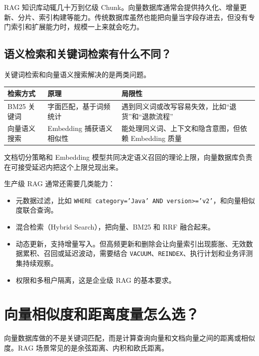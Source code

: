 \documentclass[10pt,a4paper]{ctexart}
\begin{document}
RAG 知识库动辄几十万到亿级 Chunk。向量数据库通常会提供持久化、增量更新、分片、索引构建等能力。传统数据库虽然也能把向量当字段存进去，但没有专门索引和扩展能力时，规模一上来就会吃力。



\subsection{语义检索和关键词检索有什么不同？}


关键词检索和向量语义搜索解决的是两类问题。


{\footnotesize
\begin{tabularx}{\textwidth}{|X|X|X|}
\hline
\textbf{检索方式} & \textbf{原理} & \textbf{局限性} \\
\hline
BM25 关键词 & 字面匹配，基于词频统计 & 遇到同义词或改写容易失效，比如“退货”和“退款流程” \\
\hline
向量语义搜索 & Embedding 捕获语义相似性 & 能处理同义词、上下文和隐含意图，但依赖 Embedding 质量 \\
\hline
\end{tabularx}
}



文档切分策略和 Embedding 模型共同决定语义召回的理论上限，向量数据库负责在可接受延迟内把这个上限兑现出来。



生产级 RAG 通常还需要几类能力：


\begin{itemize}[itemsep=2pt, topsep=4pt]
  \item 元数据过滤，比如 \texttt{WHERE category='Java' AND version>='v2'}，和向量相似度联合查询。
  \item 混合检索（Hybrid Search），把向量、BM25 和 RRF 融合起来。
  \item 动态更新，支持增量写入。但高频更新和删除会让向量索引出现膨胀、无效数据累积、召回或延迟波动，需要结合 \texttt{VACUUM}、\texttt{REINDEX}、执行计划和业务评测集持续观察。
  \item 权限和多租户隔离，这是企业级 RAG 的基本要求。
\end{itemize}


\section{向量相似度和距离度量怎么选？}


向量数据库做的不是关键词匹配，而是计算查询向量和文档向量之间的距离或相似度。RAG 场景常见的是余弦距离、内积和欧氏距离。
\end{document}
